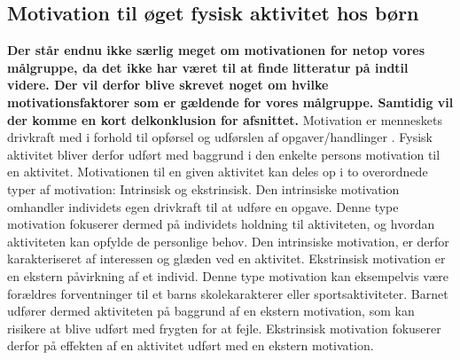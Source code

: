\subsection{Motivation til øget fysisk aktivitet hos børn} \label{motivation_boern}
\textbf{Der står endnu ikke særlig meget om motivationen for netop vores målgruppe, da det ikke har været til at finde litteratur på indtil videre. Der vil derfor blive skrevet noget om hvilke motivationsfaktorer som er gældende for vores målgruppe. Samtidig vil der komme en kort delkonklusion for afsnittet.}
Motivation er menneskets drivkraft med i forhold til opførsel og udførslen af opgaver/handlinger \citep{V.Brown2007}. Fysisk aktivitet bliver derfor udført med baggrund i den enkelte persons motivation til en aktivitet. Motivationen til en given aktivitet kan deles op i to overordnede typer af motivation: Intrinsisk og ekstrinsisk. \newline
Den intrinsiske motivation omhandler individets egen drivkraft til at udføre en opgave. Denne type motivation fokuserer dermed på individets holdning til aktiviteten, og hvordan aktiviteten kan opfylde de personlige behov. Den intrinsiske motivation, er derfor karakteriseret af interessen og glæden ved en aktivitet. \newline
Ekstrinsisk motivation er en ekstern påvirkning af et individ. Denne type motivation kan eksempelvis være forældres forventninger til et barns skolekarakterer eller sportsaktiviteter. Barnet udfører dermed aktiviteten på baggrund af en ekstern motivation, som kan risikere at blive udført med frygten for at fejle. Ekstrinsisk motivation fokuserer derfor på effekten af en aktivitet udført med en ekstern motivation. \citep{J.SebireJagoR.FoxEtAl2013} 

